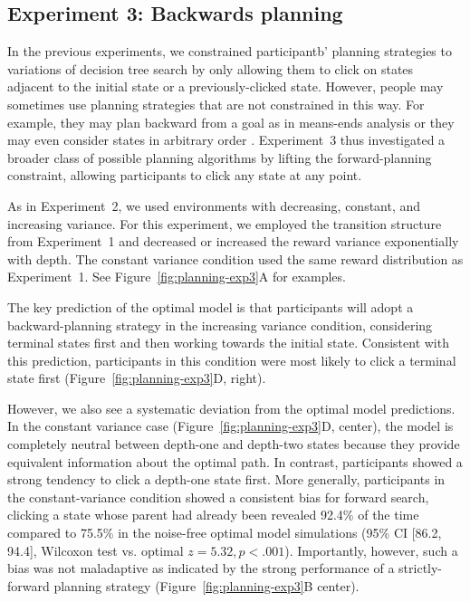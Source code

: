 \subsection{Experiment 3: Backwards planning}\label{sec:planning-results3}
In the previous experiments, we constrained participantb' planning strategies to variations of decision tree search by only allowing them to click on states adjacent to the initial state or a previously-clicked state. However, people may sometimes use planning strategies that are not constrained in this way. For example, they may plan backward from a goal as in means-ends analysis \citep{newell1972human} or they may even consider states in arbitrary order \citep{sutton1990integrated}. Experiment~3 thus investigated a broader class of possible planning algorithms by lifting the forward-planning constraint, allowing participants to click any state at any point.

As in Experiment~2, we used environments with decreasing, constant, and increasing variance. For this experiment, we employed the transition structure from Experiment~1 and decreased or increased the reward variance exponentially with depth. The constant variance condition used the same reward distribution as Experiment~1. See Figure~\ref{fig:planning-exp3}A for examples.

The key prediction of the optimal model is that participants will adopt a backward-planning strategy in the increasing variance condition, considering terminal states first and then working towards the initial state. Consistent with this prediction, participants in this condition were most likely to click a terminal state first (Figure~\ref{fig:planning-exp3}D, right).

However, we also see a systematic deviation from the optimal model predictions. In the constant variance case (Figure~\ref{fig:planning-exp3}D, center), the model is completely neutral between depth-one and depth-two states because they provide equivalent information about the optimal path. In contrast, participants showed a strong tendency to click a depth-one state first. More generally, participants in the constant-variance condition showed a consistent bias for forward search, clicking a state whose parent had already been revealed 92.4\% of the time compared to 75.5\% in the noise-free optimal model simulations (95\% CI [86.2, 94.4], Wilcoxon test vs. optimal $z = 5.32, p < .001$). Importantly, however, such a bias was not maladaptive as indicated by the strong performance of a strictly-forward planning strategy (Figure~\ref{fig:planning-exp3}B center).

